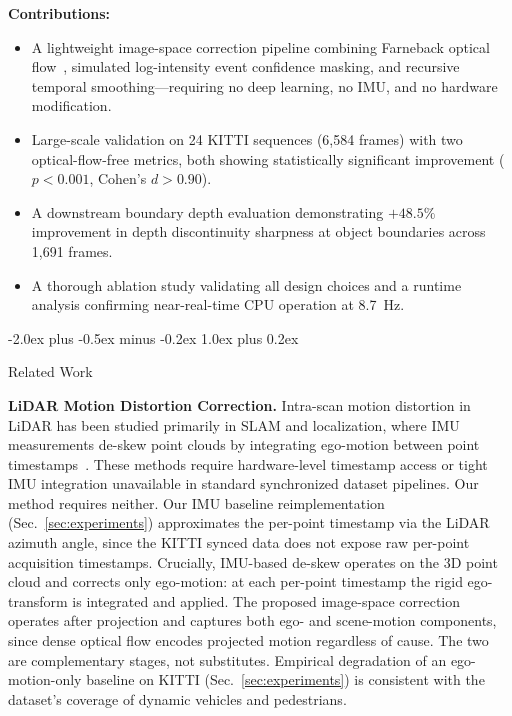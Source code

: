 \documentclass[conference]{IEEEtran}
\makeatletter
\def\section{\@startsection{section}{1}{\z@}
  {-2.0ex plus -0.5ex minus -0.2ex}
  {1.0ex plus 0.2ex}
  {\normalfont\large\bfseries\raggedright}}
\makeatother
\begin{document}
\textbf{Contributions:}
\begin{itemize}
  \item A lightweight image-space correction pipeline combining
    Farneback optical flow~\cite{farneback}, simulated
    log-intensity event confidence masking, and recursive temporal
    smoothing---requiring no deep learning, no IMU, and no
    hardware modification.
  \item Large-scale validation on 24 KITTI sequences (6{,}584
    frames) with two optical-flow-free metrics, both
    showing statistically significant improvement ($p{<}0.001$,
    Cohen's $d{>}0.90$).
  \item A downstream boundary depth evaluation demonstrating
    $+48.5\%$ improvement in depth discontinuity sharpness at
    object boundaries across 1{,}691 frames.
  \item A thorough ablation study validating all design choices
    and a runtime analysis confirming near-real-time CPU
    operation at 8.7~Hz.
\end{itemize}

\section{Related Work}

\textbf{LiDAR Motion Distortion Correction.}
Intra-scan motion distortion in LiDAR has been studied primarily
in SLAM and localization, where IMU measurements de-skew point
clouds by integrating ego-motion between point
timestamps~\cite{kitti,zhang2014loam}. These methods require
hardware-level timestamp access or tight IMU integration
unavailable in standard synchronized dataset pipelines. Our
method requires neither.
Our IMU baseline reimplementation (Sec.~\ref{sec:experiments})
approximates the per-point timestamp via the LiDAR azimuth
angle, since the KITTI synced data does not expose raw
per-point acquisition timestamps.
Crucially, IMU-based de-skew operates on the 3D point cloud and
corrects only ego-motion: at each per-point timestamp the rigid
ego-transform is integrated and applied. The proposed image-space
correction operates after projection and captures both ego- and
scene-motion components, since dense optical flow encodes
projected motion regardless of cause. The two are complementary
stages, not substitutes. Empirical degradation of an
ego-motion-only baseline on KITTI (Sec.~\ref{sec:experiments})
is consistent with the dataset's coverage of dynamic vehicles
and pedestrians.
\end{document}
